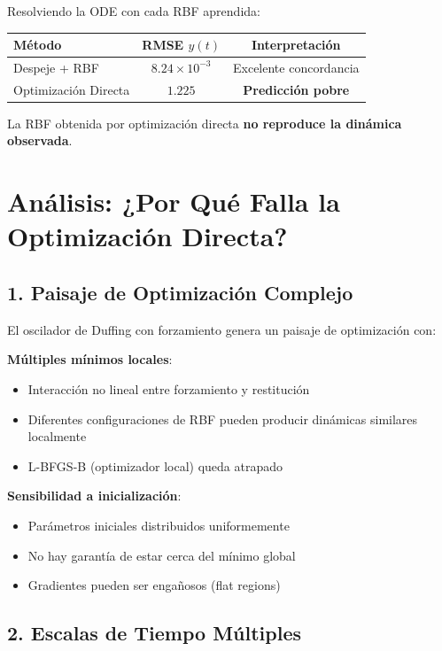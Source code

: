 \documentclass[11pt,a4paper]{article}
\begin{document}
Resolviendo la ODE con cada RBF aprendida:

\begin{table}[H]
\centering
\begin{tabular}{lcc}
\toprule
\textbf{Método} & \textbf{RMSE} $y(t)$ & \textbf{Interpretación} \\
\midrule
Despeje + RBF & $8.24 \times 10^{-3}$ & Excelente concordancia \\
\rowcolor{red!20}
Optimización Directa & $1.225$ & \textbf{Predicción pobre} \\
\bottomrule
\end{tabular}
\end{table}

La RBF obtenida por optimización directa \textbf{no reproduce la dinámica observada}.

\section{Análisis: ¿Por Qué Falla la Optimización Directa?}

\subsection{1. Paisaje de Optimización Complejo}

El oscilador de Duffing con forzamiento genera un paisaje de optimización con:

\textbf{Múltiples mínimos locales}:
\begin{itemize}
\item Interacción no lineal entre forzamiento y restitución
\item Diferentes configuraciones de RBF pueden producir dinámicas similares localmente
\item L-BFGS-B (optimizador local) queda atrapado
\end{itemize}

\textbf{Sensibilidad a inicialización}:
\begin{itemize}
\item Parámetros iniciales distribuidos uniformemente
\item No hay garantía de estar cerca del mínimo global
\item Gradientes pueden ser engañosos (flat regions)
\end{itemize}

\subsection{2. Escalas de Tiempo Múltiples}
\end{document}
